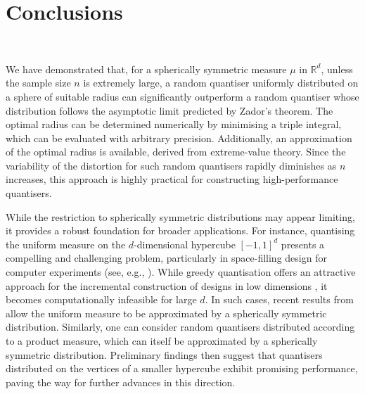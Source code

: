 \documentclass{article}
\def\RR{\mathds{R}}
\begin{document}
\section{Conclusions}~\label{S:conclusion}

We have demonstrated that, for a spherically symmetric measure $\mu$ in $\RR^d$, unless the sample size $n$ is extremely large, a random quantiser uniformly distributed on a sphere of suitable radius can significantly outperform a random quantiser whose distribution follows the asymptotic limit predicted by Zador’s theorem. The optimal radius can be determined numerically by minimising a triple integral, which can be evaluated with arbitrary precision. Additionally, an approximation of the optimal radius is available, derived from extreme-value theory. Since the variability of the distortion for such random quantisers rapidly diminishes as $n$ increases, this approach is highly practical for constructing high-performance quantisers.

While the restriction to spherically symmetric distributions may appear limiting, it provides a robust foundation for broader applications. For instance, quantising the uniform measure on the $d$-dimensional hypercube $[-1,1]^d$ presents a compelling and challenging problem, particularly in space-filling design for computer experiments (see, e.g., \cite{PronMul2012}).  While greedy quantisation offers an attractive approach for the incremental construction of designs in low dimensions \cite{LuschgyP2015,NogalesPR2021}, it becomes computationally infeasible for large $d$. In such cases, recent results from \cite{noonanhigh2024} allow the uniform measure to be approximated by a spherically symmetric distribution. Similarly, one can consider random quantisers distributed according to a product measure, which can itself be approximated by a spherically symmetric distribution. Preliminary findings then suggest that quantisers distributed on the vertices of a smaller hypercube exhibit promising performance, paving the way for further advances in this direction.


\end{document}
